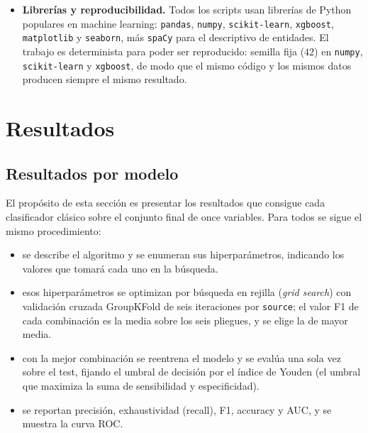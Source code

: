 \documentclass[12pt,a4paper]{report}
\theoremstyle{definition}
\newcommand{\tc}[1]{\texttt{#1}}
\begin{document}
\begin{itemize}
\item \textbf{Librerías y reproducibilidad.} Todos los scripts usan librerías de Python populares en
machine learning: \tc{pandas}, \tc{numpy}, \tc{scikit-learn}, \tc{xgboost}, \tc{matplotlib} y
\tc{seaborn}, más \tc{spaCy} para el descriptivo de entidades. El trabajo es determinista para poder ser reproducido:
semilla fija ($42$) en \tc{numpy}, \tc{scikit-learn} y \tc{xgboost}, de modo que el mismo código
y los mismos datos producen siempre el mismo resultado.
\end{itemize}

% 

\section{Resultados}

\subsection{Resultados por modelo}

El propósito de esta sección es presentar los resultados que consigue cada clasificador
clásico sobre el conjunto final de once variables. Para todos se sigue el mismo procedimiento:

\begin{itemize}
\item se describe el algoritmo y se enumeran sus hiperparámetros, indicando los valores que
tomará cada uno en la búsqueda.
\item esos hiperparámetros se optimizan por búsqueda en rejilla (\emph{grid search}) con
validación cruzada GroupKFold de seis iteraciones por \tc{source}; el valor F1 de cada
combinación es la media sobre los seis pliegues, y se elige la de mayor media.
\item con la mejor combinación se reentrena el modelo y se evalúa una sola vez sobre el test, fijando el umbral de decisión por el índice de Youden (el umbral que maximiza la
suma de sensibilidad y especificidad).
\item se reportan precisión, exhaustividad (recall), F1, accuracy y AUC, y se muestra la
curva ROC.
\end{itemize}
\end{document}
